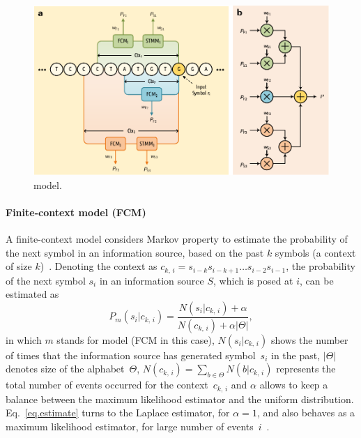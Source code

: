 \begin{figure}[!h]
  \centering
  \includegraphics[width=.85\linewidth]{data_model.pdf}
  \caption{model.}
  \label{fig.model}
\end{figure}

\paragraph{Finite-context model (FCM)}
A finite-context model considers Markov property to estimate the probability of the next symbol in an information source, based on the past $k$ symbols (a context of size $k$)~\cite{sayood2017introduction,hosseini2019ac,pinho2013mfcompress}. Denoting the context as $c_{k,\,i} = s_{i-k} s_{i-k+1}\ldots s_{i-2} s_{i-1}$, the probability of the next symbol $s_i$ in an information source $S$, which is posed at $i$, can be estimated as
\begin{equation} \label{eq.estimate}
  P_m(s_i|c_{k,\,i}) = \frac{N(s_i|c_{k,\,i})+\alpha}{N(c_{k,\,i})+ \alpha|\Theta|},
\end{equation}
in which $m$ stands for model (FCM in this case), $N(s_i|c_{k,\,i})$ shows the number of times that the information source has generated symbol~$s_i$ in the past, $|\Theta|$ denotes size of the alphabet~$\Theta$, $N(c_{k,\,i}) = \sum_{b \in \Theta} N(b|c_{k,\,i})$ represents the total number of events occurred for the context~$c_{k,\,i}$ and $\alpha$ allows to keep a balance between the maximum likelihood estimator and the uniform distribution. Eq.~\ref{eq.estimate} turns to the Laplace estimator, for $\alpha=1$, and also behaves as a maximum likelihood estimator, for large number of events~$i$~\cite{pratas2015alignment}.

